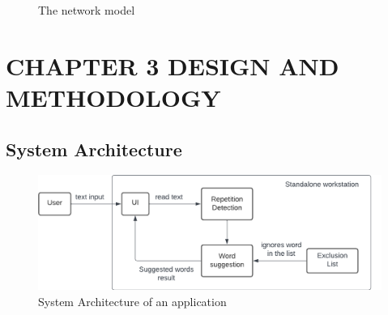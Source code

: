 \documentclass[12pt,oneside,openright,a4paper]{cpe-english-project}
\begin{document}
 
\begin{figure}[!h]\centering
\setlength{\fboxrule}{0.2mm} %
\setlength{\fboxsep}{1cm}
\caption{The network model}\label{fig:model2}
\end{figure}


\chapter{CHAPTER 3 DESIGN AND METHODOLOGY}

\section{System Architecture}
\begin{figure}[!h]\centering
\includegraphics[width=15cm]{./img/chp3/SysArch.png}
\caption{System Architecture of an application}\label{fig:sysarch}
\end{figure}
\end{document}
